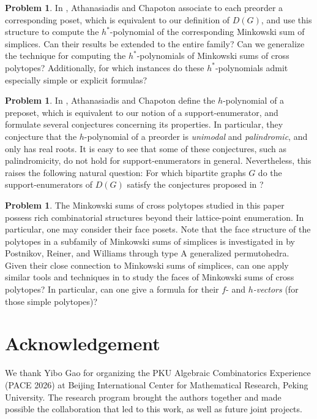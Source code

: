 \documentclass[11pt,a4paper]{article}
\newcommand{\1}{\mathbf{1}}
\theoremstyle{plain}
\theoremstyle{definition}
\newtheorem{problem}[theorem]{Problem}
\begin{document}
\begin{problem}
In \cite{chapoton2026}, Athanasiadis and Chapoton associate to each preorder a corresponding poset, which is equivalent to our definition of $D(G)$, and use this structure to compute the $h^*$-polynomial of the corresponding Minkowski sum of simplices. Can their results be extended to the entire family? Can we generalize the technique for computing the $h^*$-polynomials of Minkowski sums of cross polytopes? Additionally, for which instances do these $h^*$-polynomials admit especially simple or explicit formulas?
\end{problem}


\begin{problem}
    In \cite{chapoton2026}, Athanasiadis and Chapoton define the $h$-polynomial of a preposet, which is equivalent to our notion of a support-enumerator, and formulate several conjectures concerning its properties. In particular, they conjecture that the $h$-polynomial of a preorder is \emph{unimodal} and \emph{palindromic}, and only has real roots. It is easy to see that some of these conjectures, such as palindromicity, do not hold for support-enumerators in general. Nevertheless, this raises the following natural question: For which bipartite graphs $G$ do the support-enumerators of $D(G)$ satisfy the conjectures proposed in \cite{chapoton2026}?
\end{problem}

\begin{problem}
The Minkowski sums of cross polytopes studied in this paper possess rich combinatorial structures beyond their lattice-point enumeration. 
In particular, one may consider their face posets. Note that the face structure of the polytopes in a subfamily of Minkowski sums of simplices is investigated in \cite{PostnikovEtal2008} by Postnikov, Reiner, and Williams through type A generalized permutohedra. 
Given their close connection to Minkowski sums of simplices, can one apply similar tools and techniques in \cite{PostnikovEtal2008} to study the faces of Minkowski sums of cross polytopes? In particular, can one give a formula for their $f$- and \emph{$h$-vectors} (for those simple polytopes)? 
\end{problem}


\section*{Acknowledgement}
We thank Yibo Gao for organizing the PKU Algebraic Combinatorics Experience (PACE 2026) at Beijing International Center for Mathematical Research, Peking University. The research program brought the authors together and made possible the collaboration that led to this work, as well as future joint projects.
\end{document}
